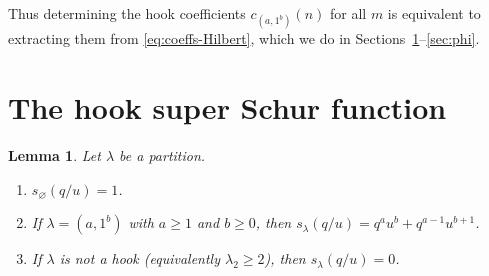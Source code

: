 \documentclass[11pt]{amsart}
\newtheorem{lemma}[theorem]{Lemma}
\theoremstyle{definition}
\begin{document}
Thus determining the hook coefficients $c_{(a,1^b)}(n)$ for all $m$ is equivalent
to extracting them from \eqref{eq:coeffs-Hilbert}, which we do in
Sections~\ref{sec:superschur}--\ref{sec:phi}.

\section{The hook super Schur function}\label{sec:superschur}

\begin{lemma}\label{lem:schur-1-1}
Let $\lambda$ be a partition.
\begin{enumerate}[\rm(i)]
\item $s_{\varnothing}(q/u)=1$.
\item If $\lambda=(a,1^b)$ with $a\ge1$ and $b\ge0$, then
$s_\lambda(q/u)= q^a u^b + q^{a-1}u^{b+1}$.
\item If $\lambda$ is not a hook (equivalently $\lambda_2\ge2$), then
$s_\lambda(q/u)=0$.
\end{enumerate}
\end{lemma}
\end{document}

